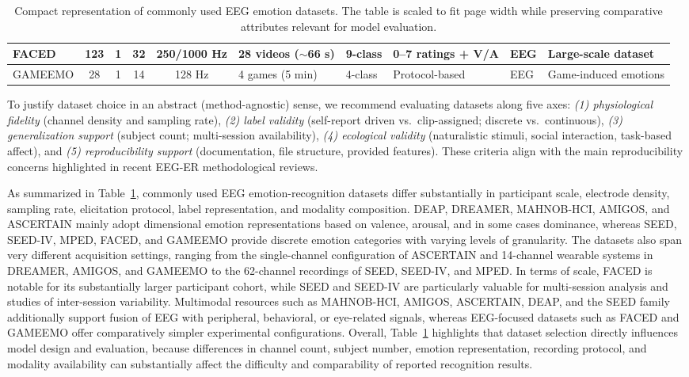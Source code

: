 \documentclass{WileyMSP-template}
\begin{document}
\begin{table}[t]
{\begin{tabular}{|p{1.45cm}|c|c|c|c|p{2.2cm}|p{1.9cm}|p{1.9cm}|p{1.9cm}|p{2.6cm}|}
\hline
FACED \cite{chen2023faced} & 123 & 1 & 32 & 250/1000 Hz & 28 videos ($\sim$66 s) & 9-class & 0--7 ratings + V/A & EEG & Large-scale dataset \\

\hline
GAMEEMO \cite{alakus2021gameemo} & 28 & 1 & 14 & 128 Hz & 4 games (5 min) & 4-class & Protocol-based & EEG & Game-induced emotions \\

\hline
\end{tabular}
}

\caption{Compact representation of commonly used EEG emotion datasets. The table is scaled to fit page width while preserving comparative attributes relevant for model evaluation.}
\label{tab:dataset_attr}
\end{table}

To justify dataset choice in an abstract (method-agnostic) sense, we recommend evaluating datasets along five axes:
\textit{(1) physiological fidelity} (channel density and sampling rate),
\textit{(2) label validity} (self-report driven vs.\ clip-assigned; discrete vs.\ continuous),
\textit{(3) generalization support} (subject count; multi-session availability),
\textit{(4) ecological validity} (naturalistic stimuli, social interaction, task-based affect),
and \textit{(5) reproducibility support} (documentation, file structure, provided features).
These criteria align with the main reproducibility concerns highlighted in recent EEG-ER methodological reviews. \cite{li2022tutorial,kukhilava2025evaluation,brookshire2024leakage}

As summarized in Table~\ref{tab:dataset_attr}, commonly used EEG emotion-recognition datasets differ substantially in participant scale, electrode density, sampling rate, elicitation protocol, label representation, and modality composition. DEAP, DREAMER, MAHNOB-HCI, AMIGOS, and ASCERTAIN mainly adopt dimensional emotion representations based on valence, arousal, and in some cases dominance, whereas SEED, SEED-IV, MPED, FACED, and GAMEEMO provide discrete emotion categories with varying levels of granularity. The datasets also span very different acquisition settings, ranging from the single-channel configuration of ASCERTAIN and 14-channel wearable systems in DREAMER, AMIGOS, and GAMEEMO to the 62-channel recordings of SEED, SEED-IV, and MPED. In terms of scale, FACED is notable for its substantially larger participant cohort, while SEED and SEED-IV are particularly valuable for multi-session analysis and studies of inter-session variability. Multimodal resources such as MAHNOB-HCI, AMIGOS, ASCERTAIN, DEAP, and the SEED family additionally support fusion of EEG with peripheral, behavioral, or eye-related signals, whereas EEG-focused datasets such as FACED and GAMEEMO offer comparatively simpler experimental configurations. Overall, Table~\ref{tab:dataset_attr} highlights that dataset selection directly influences model design and evaluation, because differences in channel count, subject number, emotion representation, recording protocol, and modality availability can substantially affect the difficulty and comparability of reported recognition results.
\end{document}
